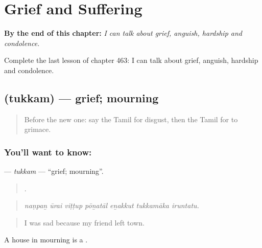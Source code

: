 
\chapter{Grief and Suffering}
\label{ch:ta-grief-and-suffering}

\begin{chapteropening}
\textbf{By the end of this chapter:} \emph{I can talk about grief, anguish, hardship and condolence.}

Complete the last lesson of chapter 463: I can talk about grief, anguish, hardship and condolence.
\end{chapteropening}

\section[\texorpdfstring{\ta{துக்கம்} (tukkam)}{துக்கம் (tukkam)}]{ (tukkam) — grief; mourning}

\label{lesson:TA-C463-tukkam}



\begin{quote}
Before the new one: say the Tamil for disgust, then the Tamil for to grimace.
\end{quote}

\subsection*{You'll want to know: }
\textbf{} — \emph{tukkam} — \textquotedblleft{}grief; mourning\textquotedblright{}.

\begin{quote}
      .
\end{quote}

\begin{quote}
\emph{naṇpaṉ ūrai viṭṭup pōṉatāl eṉakkut tukkamāka iruntatu.}
\end{quote}

\begin{quote}
I was sad because my friend left town.
\end{quote}

A house in mourning is a  .


